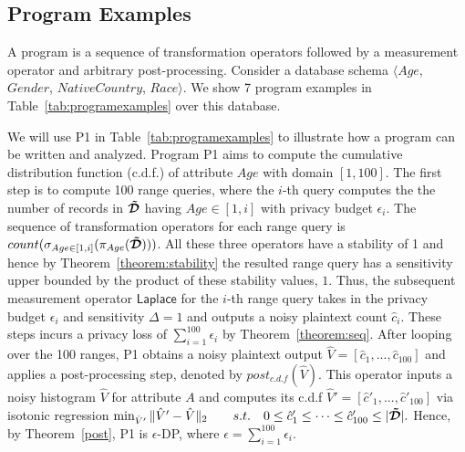 \vspace{-0.35cm}\subsection{Program Examples}
A \system program is a sequence of transformation operators followed by a measurement operator and arbitrary post-processing. Consider a database schema $\langle Age$, $Gender$, $NativeCountry$, $Race\rangle$. We show 7 \system program examples in Table~\ref{tab:programexamples} over this database.

We will use P1 in Table~\ref{tab:programexamples} to illustrate how a \system program can be written and  analyzed. Program P1 aims to compute the cumulative distribution function (c.d.f.) of attribute $Age$ with domain $[1,100]$. The first step is to compute 100 range queries, where the $i$-th query computes the the number of records in $\boldsymbol{\tilde{\mathcal{D}}}$ having $Age \in [1,i]$ with privacy budget $\epsilon_i$.  The sequence of transformation operators for each range query is $count(\sigma_{Age\in [1,i]}(\pi_{Age}(\boldsymbol{\tilde{\mathcal{D}}})))$. All these three operators have a stability of 1 and hence by Theorem~\ref{theorem:stability} the resulted range query has a sensitivity upper bounded by the product of these stability values, $1$. Thus, the subsequent measurement operator $\textsf{Laplace}$ for the $i$-th range query takes in the privacy budget $\epsilon_i$ and sensitivity $\Delta=1$ and outputs a noisy plaintext count $\hat{c}_i$. These steps incurs a privacy loss of $\sum_{i=1}^{100} \epsilon_i$ by Theorem~\ref{theorem:seq}. After looping over the 100 ranges, P1 obtains a  noisy plaintext output $\hat{V}=[\hat{c}_1,...,\hat{c}_{100}]$ and applies a post-processing step, denoted by $post_{c.d.f}(\hat{V})$. This operator inputs a noisy histogram $\hat{V}$ for attribute $A$ and computes its c.d.f $\hat{V}'=[\hat{c}'_1,...,\hat{c}'_{100}]$ via isotonic regression 
$\min_{\hat{V}'} \|\hat{V}'-\hat{V}\|_2 ~~~~~~s.t.~~~ 0\leq\hat{c}'_1\leq \cdots \leq \hat{c}'_{100} \leq |\boldsymbol{\tilde{\mathcal{D}}}|.$
Hence, by Theorem~\ref{post}, P1 is $\epsilon$-DP, where $\epsilon=\sum_{i=1}^{100} \epsilon_i$. 

